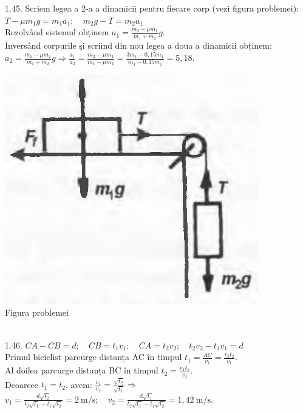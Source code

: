 1.45. Scriem legea a 2-a a dinamicii pentru fiecare corp (vezi figura problemei):\\ $T-\mu m_{1} g=m_{1} a_{1}; \quad m_{2} g-T=m_{2} a_{1}$\\ Rezolvând sistemul obținem $a_{1}=\frac{m_{2}-\mu m_{1}}{m_{1}+m_{2}} g$.\\ Inversând corpurile şi scriind din nou legea a doua a dinamicii obținem:\\ $a_{2}=\frac{m_{1}-\mu m_{2}}{m_{1}+m_{2}} g \Rightarrow \frac{a_{1}}{a_{2}}=\frac{m_{2}-\mu m_{1}}{m_{1}-\mu m_{2}}=\frac{3 m_{1}-0,15 m_{1}}{m_{1}-0,15 m_{1}}=5,18$.\\ \begin{center} \includegraphics[width=0.4\linewidth]{images/2025_07_01_5b3ff9fa0d508c8e9f17g-206}\\ Figura problemei \end{center}\\

1.46. $CA-CB=d; \quad CB=t_{1} v_{1}; \quad CA=t_{2} v_{2}; \quad t_{2} v_{2}-t_{1} v_{1}=d$\\ Primul biciclist parcurge distanța AC în timpul $t_{1}=\frac{A C}{v_{1}}=\frac{v_{2} t_{2}}{v_{1}}$.\\ Al doilea parcurge distanța BC în timpul $t_{2}=\frac{v_{1} t_{1}}{v_{2}}$.\\ Deoarece $t_{1}=t_{2}$, avem: $\frac{v_{1}}{v_{2}}=\frac{\sqrt{t_{2}}}{\sqrt{t_{1}}} \Rightarrow$\\ $v_{1}=\frac{d \sqrt{t_{2}}}{t_{2} \sqrt{t_{1}}-t_{1} \sqrt{t_{2}}}=2 \mathrm{~m} / \mathrm{s}; \quad v_{2}=\frac{d \sqrt{t_{1}}}{t_{2} \sqrt{t_{1}}-t_{1} \sqrt{t_{2}}}=1,42 \mathrm{~m} / \mathrm{s}$.\\

